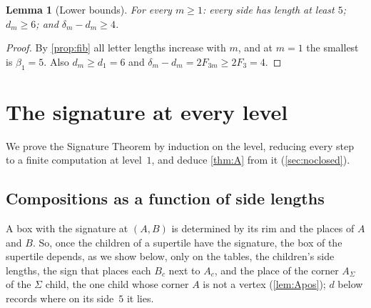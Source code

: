 \documentclass[11pt]{amsart}
\newtheorem{lemma}[theorem]{Lemma}
\theoremstyle{definition}
\theoremstyle{remark}
\newcommand{\Fib}{F}
\begin{document}
\begin{lemma}[Lower bounds]\label{lem:bounds}
For every $m\ge1$: every side has length at least $5$; $d_m\ge6$; and $\delta_m-d_m\ge4$.
\end{lemma}

\begin{proof}
By \cref{prop:fib} all letter lengths increase with $m$, and at $m=1$ the smallest is $\beta_1=5$. Also $d_m\ge d_1=6$ and
$\delta_m-d_m=2\Fib_{3m}\ge 2\Fib_3=4$.
\end{proof}

\section{The signature at every level}\label{sec:induction}

We prove the Signature Theorem by induction on the level, reducing every step to a finite computation at level~$1$,
and deduce \cref{thm:A} from it (\cref{sec:noclosed}).

\subsection{Compositions as a function of side lengths}\label{sec:comp}
A box with the signature at $(A,B)$ is determined by its rim and the places of $A$ and $B$. So, once the children of a
supertile have the signature, the box of the supertile depends, as we show below, only on the tables, the children's
side lengths, the sign that places each $B_c$ next to $A_c$, and the place of the corner $A_\Sigma$ of the $\Sigma$ child,
the one child whose corner $A$ is not a vertex (\cref{lem:Apos}); $d$ below records where on its side~$5$ it lies.
\end{document}
